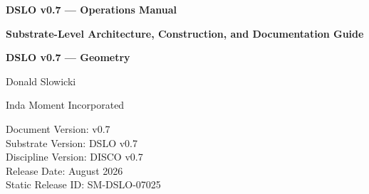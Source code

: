 

\begin{titlepage}
\centering

{\Large\bfseries DSLO v0.7 --- Operations Manual\par}
\vspace{2em}
{\large\bfseries Substrate-Level Architecture, Construction, and Documentation Guide\par}
\vspace{1em}

{\Large\bfseries DSLO v0.7 --- Geometry\par}

\vspace{2em}
{\large Donald Slowicki\par}
{\small Inda Moment Incorporated\par}

\vfill

{\small
Document Version: v0.7\\
Substrate Version: DSLO v0.7\\
Discipline Version: DISCO v0.7\\
Release Date: August 2026\\
Static Release ID: SM-DSLO-07025\\
}

\end{titlepage}


